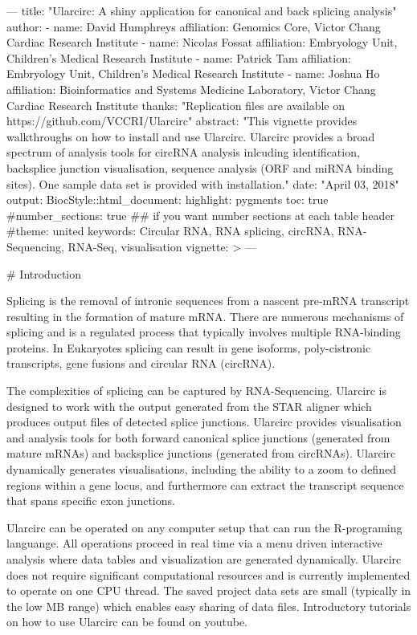 ---
title: "Ularcirc: A shiny application for canonical and back splicing analysis"
author: 
  - name: David Humphreys
    affiliation: Genomics Core, Victor Chang Cardiac Research Institute
  - name: Nicolas Fossat
    affiliation: Embryology Unit, Children's Medical Research Institute
  - name: Patrick Tam
    affiliation: Embryology Unit, Children's Medical Research Institute
  - name: Joshua Ho
    affiliation: Bioinformatics and Systems Medicine Laboratory, Victor Chang Cardiac Research Institute
thanks: "Replication files are available on https://github.com/VCCRI/Ularcirc"
abstract: "This vignette provides walkthroughs on how to install and use Ularcirc. Ularcirc provides a broad spectrum of analysis tools for circRNA analysis inlcuding  identification, backsplice junction visualisation, sequence analysis (ORF and miRNA binding sites). One sample data set is provided with installation."
date: "April 03, 2018"
output: 
    BiocStyle::html_document:
    highlight: pygments
    toc: true
    #number_sections: true  ## if you want number sections at each table header
    #theme: united 
keywords: Circular RNA, RNA splicing, circRNA, RNA-Sequencing, RNA-Seq, visualisation
vignette: >
---






# Introduction

Splicing is the removal of intronic sequences from a nascent pre-mRNA transcript resulting in the formation of mature mRNA. There are numerous mechanisms of splicing and is a regulated process that typically involves multiple RNA-binding proteins. In Eukaryotes splicing can result in gene isoforms, poly-cistronic transcripts, gene fusions and circular RNA (circRNA).

 The complexities of splicing  can be captured by RNA-Sequencing. Ularcirc is designed to work with the output generated from the STAR aligner which produces output files of detected splice junctions. Ularcirc provides visualisation and analysis tools for both forward canonical splice junctions (generated from mature mRNAs) and backsplice junctions (generated from circRNAs). Ularcirc dynamically generates visualisations, including the ability to a zoom to defined regions within a gene locus, and furthermore can extract the transcript sequence that spans specific exon junctions.
 
 Ularcirc can be operated on any computer setup that can run the R-programing languange. All operations proceed in real time via a menu driven interactive analysis where data tables and visualization are generated dynamically. Ularcirc does not require significant computational resources and is currently implemented to operate on one CPU thread. The saved project data sets are small (typically in the low MB range) which enables easy sharing of data files. Introductory tutorials on how to use Ularcirc can be found on youtube. 
 
